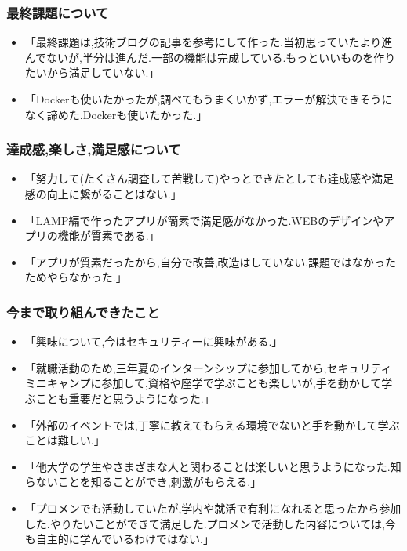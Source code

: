 \documentclass[11pt, a4paper]{jreport}
\begin{document}
\subsubsection{最終課題について}

\begin{itemize}
\item 「最終課題は,技術ブログの記事を参考にして作った.当初思っていたより進んでないが,半分は進んだ.一部の機能は完成している.もっといいものを作りたいから満足していない.」
\item 「Dockerも使いたかったが,調べてもうまくいかず,エラーが解決できそうになく諦めた.Dockerも使いたかった.」
\end{itemize}

\subsubsection{達成感,楽しさ,満足感について}

\begin{itemize}
\item 「努力して(たくさん調査して苦戦して)やっとできたとしても達成感や満足感の向上に繋がることはない.」
\item 「LAMP編で作ったアプリが簡素で満足感がなかった.WEBのデザインやアプリの機能が質素である.」
\item 「アプリが質素だったから,自分で改善,改造はしていない.課題ではなかったためやらなかった.」
\end{itemize}

\subsubsection{今まで取り組んできたこと}

\begin{itemize}
\item 「興味について,今はセキュリティーに興味がある.」
\item 「就職活動のため,三年夏のインターンシップに参加してから,セキュリティミニキャンプに参加して,資格や座学で学ぶことも楽しいが,手を動かして学ぶことも重要だと思うようになった.」
\item 「外部のイベントでは,丁寧に教えてもらえる環境でないと手を動かして学ぶことは難しい.」
\item 「他大学の学生やさまざまな人と関わることは楽しいと思うようになった.知らないことを知ることができ,刺激がもらえる.」
\item 「プロメンでも活動していたが,学内や就活で有利になれると思ったから参加した.やりたいことができて満足した.プロメンで活動した内容については,今も自主的に学んでいるわけではない.」
\end{itemize}
\end{document}
